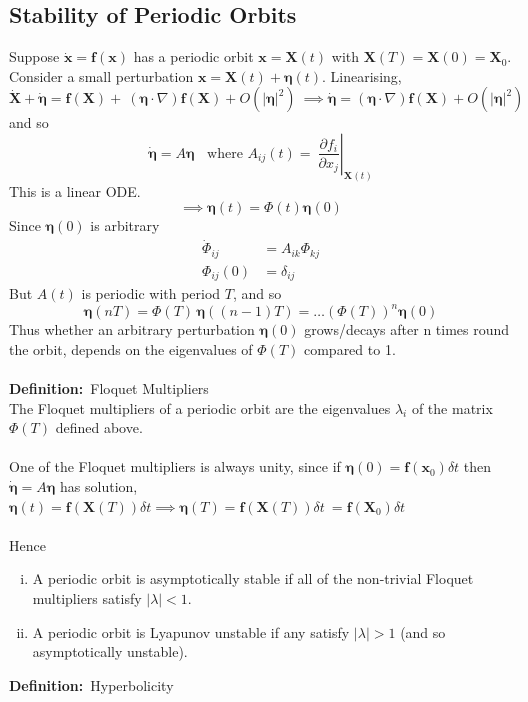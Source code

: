 \documentclass{article}
\newcommand{\definition}{\textbf{Definition:}}              %
\newcommand{\bx}{\bm{x}}                                    %
\newcommand{\xeq}[1] { \dot{\bm{ #1 }} = \bm{f}(\bm{ #1}) } %
\begin{document}
\subsection{Stability of Periodic Orbits}
Suppose $\xeq{x}$ has a periodic orbit $\bx = \bm{X}(t)$ with 
$\bm{X}(T) = \bm{X}(0) = \bm{X}_0$.
\\
Consider a small perturbation $\bx = \bm{X}(t) + \bm{\eta}(t)$.
Linearising, 
\[ \dot{\bm{X}} + \dot{\bm{\eta}} = \bm{f}(\bm{X}) +\
(\bm{\eta}\cdot \nabla) \bm{f} ( \bm{X}) + O(|\bm{\eta}|^2) \
\implies \dot{\bm{\eta}} =(\bm{\eta}\cdot \nabla) \bm{f} ( \bm{X}) + O(|\bm{\eta}|^2) \]
and so
\[ \dot{\bm{\eta}} = A \bm{\eta} \;\; \mbox{ where } A_{ij}(t) = \left. \
\frac{\partial f_i}{\partial x_j} \right|_{\bm{X}(t)} \]
This is a linear ODE.
\[ \implies \bm{\eta}(t) = \Phi(t) \bm{\eta}(0) \]
Since $\bm{\eta}(0)$ is arbitrary
\begin{align*}
\dot{\Phi}_{ij}\quad \; &= A_{ik} \Phi_{kj} \\
\Phi_{ij}(0) &= \delta_{ij}
\end{align*}
But $A(t)$ is periodic with period $T$, and so
\[ \bm{\eta}(nT) = \Phi(T) \, \bm{\eta}\left( (n-1)T\right) = \dots (\Phi(T))^n \bm{\eta}(0) \]
Thus whether an arbitrary perturbation $\bm{\eta}(0)$ grows/decays after n
times round the orbit, depends on the eigenvalues of $\Phi(T)$ compared to 1.
\\
\\
\definition\ Floquet Multipliers
\\
The Floquet multipliers of a periodic orbit are the eigenvalues $\lambda_i$ of
the matrix $\Phi(T)$ defined above.
\\
\\
One of the Floquet multipliers is always unity, since if $\bm{\eta}(0) = \bm{f}(\bx_0) 
\delta t$ then $\dot{\bm{\eta}} = A \bm{\eta}$ has solution,
$\bm{\eta}(t) = \bm{f}(\bm{X}(T))\delta t \implies \bm{\eta}(T) = \bm{f}(\bm{X}(T))\delta t\
= \bm{f}(\bm{X}_0)\delta t$
\\
\\
Hence
\begin{enumerate}[(i)]
\item A periodic orbit is asymptotically stable if all of the non-trivial
	Floquet multipliers satisfy $|\lambda|<1$.
\item A periodic orbit is Lyapunov unstable if any satisfy $|\lambda|>1$
	(and so asymptotically unstable).
\end{enumerate}
\definition\ Hyperbolicity
\\
\end{document}
